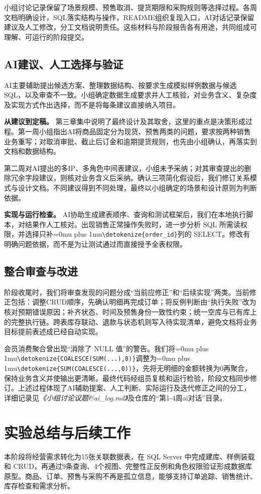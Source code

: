 \documentclass{SYSUReport}
\newcommand{\code}[1]{\begingroup\Urlmuskip=0mu plus 1mu\expandafter\nolinkurl\expandafter{\detokenize{#1}}\endgroup}
\newcommand{\docref}[1]{\textit{《#1》}}
\begin{document}
小组讨论记录保留了场景规模、预售取消、提货期限和采购规则等选择过程。各周文档明确设计，SQL落实结构与操作，README组织复现入口，AI对话记录保留建议及人工修改，分工文档说明责任。这些材料与阶段报告各有用途，共同组成可理解、可运行的阶段提交。

\subsection{AI建议、人工选择与验证}
AI主要辅助提出候选方案、整理数据结构、按要求生成模拟样例数据与候选 SQL，以及审查不一致。小组确定数据生成要求并人工核验，对业务含义、复杂度及实现方式作出选择，而不是将每条建议直接纳入项目。

\textbf{从建议到定稿。} 第三章集中说明了最终设计及其取舍，这里的重点是决策形成过程。第一周小组指出AI将商品固定分为现货、预售两类的问题，要求按两种销售业务重写；对取消审批、截止后订金和逾期提货规则，也先由小组确认，再落实到文档和数据结构。

第二周对AI提出的多IP、多角色中间表建议，小组未予采纳；对其审查提出的删除冗余字段建议，则核对业务含义后采纳。确认三项简化假设后，我们修订关系模式与设计文档。不同建议得到不同处理，最终以小组确定的场景和设计原则为判断依据。

\textbf{实现与运行检查。} AI协助生成建表顺序、查询和测试框架后，我们在本地执行脚本，对结果作人工核对。出现销售正常操作失败时，进一步分析 SQL 所需读权限，并选择只补\code{order_id}列的 SELECT。修改有明确问题依据，而不是为让测试通过而直接授予全表权限。

\subsection{整合审查与改进}
阶段收尾时，我们将审查发现的问题分成“当前应修正”和“后续实现”两类。当前修正包括：调整CRUD顺序，先确认明细再完成订单；将反例判断由“执行失败”改为核对预期错误原因；补齐状态、时间及预售身份一致性约束；统一空库与已有库上的完整执行链。跨表库存联动、退款与状态机则写入待实现清单，避免文档将业务目标提前表述成已经自动实现。

会员消费聚合曾出现“消除了 NULL 值”的警告。我们将\code{COALESCE(SUM(...),0)}调整为\code{SUM(COALESCE(...,0))}，先将无明细的金额转换为0再聚合，保持业务含义并使输出更清晰。最终代码经组员复核和运行检验，阶段文档同步修订。上述过程体现了AI辅助提案、人工判断、实际运行及迭代修正之间的分工，详细记录见\docref{小组讨论议题\&ai\_log.md}及仓库的“第1-4周ai对话”目录。

\section{实验总结与后续工作}
本阶段将经营需求转化为15张关联数据表，在 SQL Server 中完成建库、样例装载和 CRUD，再通过9条查询、4个视图、完整性正反例和角色权限验证形成数据库原型。商品、订单、预售与采购不再是孤立信息，能够支持订单追踪、销售统计、库存检查和需求分析。
\end{document}
